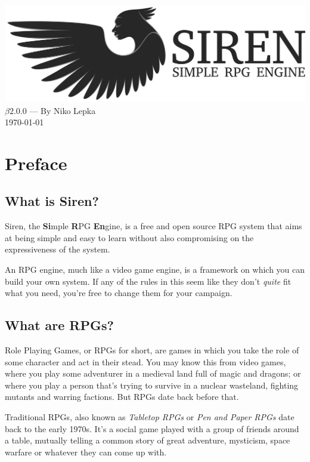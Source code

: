 \documentclass[a4paper]{book}
\begin{document}
\begin{titlepage}
\begin{center}
  \includegraphics[width = \textwidth]{graphics/svg-logo.png}
  \LARGE{$\beta2.0.0$ --- By Niko Lepka}\\
  \Large{\today}
\end{center}
\end{titlepage}
\thispagestyle{empty} %
\frontmatter %
\chapter*{Preface}
\section*{What is Siren?}
Siren, the \textbf{Si}mple \textbf{R}PG \textbf{En}gine, is a free and open source RPG system that aims at being simple and easy to learn without also compromising on the expressiveness of the system.

An RPG engine, much like a video game engine, is a framework on which you can build your own system. If any of the rules in this seem like they don't \textit{quite} fit what you need, you're free to change them for your campaign.

\section*{What are RPGs?}
Role Playing Games, or RPGs for short, are games in which you take the role of some character and act in their stead.
You may know this from video games, where you play some adventurer in a medieval land full of magic and dragons; or where you play a person that's trying to survive in a nuclear wasteland, fighting mutants and warring factions.
But RPGs date back before that.

Traditional RPGs, also known as \textit{Tabletop RPGs} or \textit{Pen and Paper RPGs} date back to the early 1970s.
It's a social game played with a group of friends around a table, mutually telling a common story of great adventure, mysticism, space warfare or whatever they can come up with.
\end{document}
